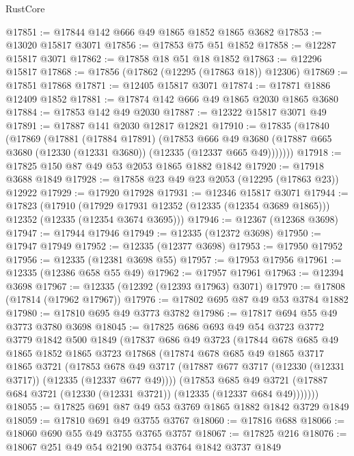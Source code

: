 \begin{lexlean}{RustCore}
\begin{coremodule}
@17851 := @17844 @142 @666 @49 @1865 @1852 @1865 @3682
@17853 := @13020 @15817 @3071
@17856 := @17853 @75 @51 @1852
@17858 := @12287 @15817 @3071
@17862 := @17858 @18 @51 @18 @1852
@17863 := @12296 @15817
@17868 := @17856 (@17862 (@12295 (@17863 @18)) @12306)
@17869 := @17851 @17868
@17871 := @12405 @15817 @3071
@17874 := @17871 @1886 @12409 @1852
@17881 := @17874 @142 @666 @49 @1865 @2030 @1865 @3680
@17884 := @17853 @142 @49 @2030
@17887 := @12322 @15817 @3071 @49
@17891 := @17887 @141 @2030 @12817 @12821
@17910 := @17835
    (@17840
      (@17869
        (@17881
          (@17884 @17891)
          (@17853
            @666
            @49
            @3680
            (@17887 @665 @3680 (@12330 (@12331 @3680)) (@12335 (@12337 @665 @49)))))))
@17918 := @17825 @150 @87 @49 @53 @2053 @1865 @1882 @1842
@17920 := @17918 @3688 @1849
@17928 := @17858 @23 @49 @23 @2053 (@12295 (@17863 @23)) @12922
@17929 := @17920 @17928
@17931 := @12346 @15817 @3071
@17944 := @17823
    (@17910
      (@17929 @17931 @12352 (@12335 (@12354 @3689 @1865)))
      @12352
      (@12335 (@12354 @3674 @3695)))
@17946 := @12367 (@12368 @3698)
@17947 := @17944 @17946
@17949 := @12335 (@12372 @3698)
@17950 := @17947 @17949
@17952 := @12335 (@12377 @3698)
@17953 := @17950 @17952
@17956 := @12335 (@12381 @3698 @55)
@17957 := @17953 @17956
@17961 := @12335 (@12386 @658 @55 @49)
@17962 := @17957 @17961
@17963 := @12394 @3698
@17967 := @12335 (@12392 (@12393 @17963) @3071)
@17970 := @17808 (@17814 (@17962 @17967))
@17976 := @17802 @695 @87 @49 @53 @3784 @1882
@17980 := @17810 @695 @49 @3773 @3782
@17986 := @17817 @694 @55 @49 @3773 @3780 @3698
@18045 := @17825
    @686
    @693
    @49
    @54
    @3723
    @3772
    @3779
    @1842
    @500
    @1849
    (@17837
      @686
      @49
      @3723
      (@17844
        @678
        @685
        @49
        @1865
        @1852
        @1865
        @3723
        @17868
        (@17874
          @678
          @685
          @49
          @1865
          @3717
          @1865
          @3721
          (@17853
            @678
            @49
            @3717
            (@17887 @677 @3717 (@12330 (@12331 @3717)) (@12335 (@12337 @677 @49))))
          (@17853
            @685
            @49
            @3721
            (@17887 @684 @3721 (@12330 (@12331 @3721)) (@12335 (@12337 @684 @49)))))))
@18055 := @17825 @691 @87 @49 @53 @3769 @1865 @1882 @1842 @3729 @1849
@18059 := @17810 @691 @49 @3755 @3767
@18060 := @17816 @688
@18066 := @18060 @690 @55 @49 @3755 @3765 @3757
@18067 := @17825 @216
@18076 := @18067 @251 @49 @54 @2190 @3754 @3764 @1842 @3737 @1849

\end{coremodule}
\end{lexlean}
